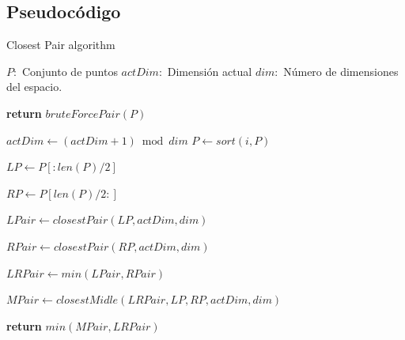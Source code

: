 \documentclass{article}
\begin{document}
	\subsection{Pseudocódigo}
		\begin{algorithm}[H]

			\caption{Closest Pair algorithm}

			\label{euclid}

			\begin{algorithmic}[1] %

				\State $P:$ Conjunto de puntos
				\State $actDim:$ Dimensión actual
				\State $dim:$ Número de dimensiones del espacio.
				\State
			
					
					\State \textbf{return}  $bruteForcePair(P)$ 
				\Else
					
					\State $actDim\gets(actDim+1) \bmod dim$ 	
					\State $P \gets sort(i, P)$
					
					\State
					
					\State $LP \gets P[:len(P)/2]$
					
					\State $RP \gets P[len(P)/2:]$
					
					\State
					
					\State $LPair \gets closestPair(LP, actDim, dim)$
					
					\State $RPair \gets closestPair(RP, actDim, dim)$
					
					\State $LRPair \gets min(LPair, RPair)$
					
					\State
					
					\State $MPair \gets closestMidle(LRPair, LP, RP, actDim, dim)$
					
					\State

					\State \textbf{return} $min(MPair, LRPair)$
	
				\EndIf
			
			\EndProcedure

			\end{algorithmic}

		\end{algorithm}
		
\end{document}
